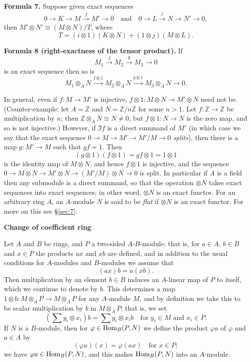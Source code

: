 \textbf{Formula 7.} Suppose given exact sequences
\[
  0 \to K \to M \xrightarrow{f} M' \to 0 \quad \text{and} \quad 0 \to L \xrightarrow{j} N \to N' \to 0,
\]
then $M' \otimes N' \cong (M \otimes N)/T$, where
\[
  T = (i \otimes 1)(K \otimes N) + (1 \otimes j)(M \otimes L).
\]

\textbf{Formula 8 (right-exactness of the tensor product).} If
\[
  M_1 \xrightarrow{f} M_2 \xrightarrow{g} M_3 \to 0
\]
is an exact sequence then so is
\[
  M_1 \otimes_A N \xrightarrow{f \otimes 1} M_2 \otimes_A N \xrightarrow{g \otimes 1} M_3 \otimes_A N \to 0.
\]

In general, even if $f\colon M \to M'$ is injective, $f \otimes 1\colon M \otimes N \to M' \otimes N$ need
not be. (Counter-example: let $A = \mathbb{Z}$ and $N = \mathbb{Z}/n\mathbb{Z}$ for some $n > 1$. Let
$f\colon \mathbb{Z} \to \mathbb{Z}$ be multiplication by $n$; then $\mathbb{Z} \otimes_A N \cong N \ne 0$, but
$f \otimes 1\colon N \to N$ is the zero map, and so is not injective.) However, if $\Im f$ is a
direct summand of $M'$ (in which case we say that the exact sequence
$0 \to M \to M' \to M'/M \to 0$ \emph{splits}), then there is a map $g\colon M' \to M$ such that
$gf = 1$. Then
\[
  (g \otimes 1)(f \otimes 1) = gf \otimes 1 = 1 \otimes 1
\]
is the identity map of $M \otimes N$, and hence $f \otimes 1$ is injective, and the sequence
$0 \to M \otimes N \to M' \otimes N \to (M'/M) \otimes N \to 0$ is split. In particular if $A$ is a
field then any submodule is a direct summand, so that the operation
$\otimes N$ takes exact sequences into exact sequences; in other word, $\otimes N$ is
an exact functor. For an arbitrary ring $A$, an $A$-module $N$ is said to be
\emph{flat} if $\otimes N$ is an exact functor. For more on this see \S\ref{sec:7}.

\medskip
\noindent\textbf{Change of coefficient ring}

Let $A$ and $B$ be rings, and $P$ a two-sided $A$-$B$-module; that is, for $a \in A$,
$b \in B$ and $x \in P$ the products $ax$ and $xb$ are defined, and in addition to the
usual conditions for $A$-modules and $B$-modules we assume that
\[
  (ax)b = a(xb).
\]
Then multiplication by an element $b \in B$ induces an $A$-linear map of $P$ to
itself, which we continue to denote by $b$. This determines a map
$1 \otimes b\colon M \otimes_A P \to M \otimes_A P$ for any $A$-module $M$, and by definition we take
this to be scalar multiplication by $b$ in $M \otimes_A P$; that is, we set
\[
  (\sum y_i \otimes x_i)b = \sum y_i \otimes x_ib \quad \text{for } y_i \in M \text{ and } x_i \in P.
\]
If $N$ is a $B$-module, then for $\varphi \in \operatorname{Hom}_B(P, N)$ we define the product
$\varphi a$ of $\varphi$ and $a \in A$ by
\[
  (\varphi a)(x) = \varphi(ax) \quad \text{for } x \in P;
\]
we have $\varphi a \in \operatorname{Hom}_B(P, N)$, and this makes $\operatorname{Hom}_B(P, N)$ into an $A$-module.


